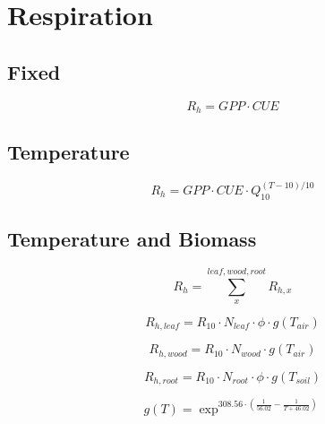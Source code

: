 \section{Respiration}

\subsection{Fixed}

\begin{equation}
	R_{h} = GPP \cdot CUE
\end{equation}

\subsection{Temperature}

\begin{equation}
	R_{h} = GPP \cdot CUE \cdot Q_{10}^{(T-10)/10}
\end{equation}

\subsection{Temperature and Biomass}

\begin{equation}
	R_{h} = \sum_{x}^{leaf,wood,root} R_{h,x}
\end{equation}

\begin{equation}
	R_{h,leaf} = R_{10} \cdot N_{leaf} \cdot \phi \cdot g(T_{air})
\end{equation}

\begin{equation}
	R_{h,wood} = R_{10} \cdot N_{wood} \cdot g(T_{air})
\end{equation}

\begin{equation}
	R_{h,root} = R_{10} \cdot N_{root} \cdot \phi \cdot g(T_{soil})
\end{equation}

\begin{equation}
	g(T) = \exp^{308.56 \cdot (\frac{1}{56.02} - \frac{1}{T + 46.02})}
\end{equation}
